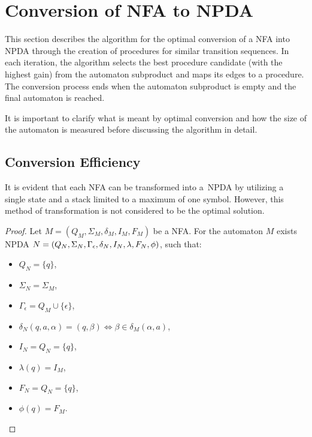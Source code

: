 \section{Conversion of NFA to NPDA}
    This section describes the algorithm for the optimal conversion of a NFA into NPDA through the creation of procedures for similar transition sequences. In each iteration, the algorithm selects the best procedure candidate (with the highest gain) from the automaton subproduct and maps its edges to a procedure. The conversion process ends when the automaton subproduct is empty and the final automaton is reached.

    It is important to clarify what is meant by optimal conversion and how the size of the automaton is measured before discussing the algorithm in detail.

    \subsection{Conversion Efficiency}
        \label{subsec:efficiency}
        It is evident that each NFA can be transformed into a~NPDA by utilizing a single state and a stack limited to a maximum of one symbol. However, this method of transformation is not considered to be the optimal solution.

        \begin{proof}
            Let $M = (Q_M, \Sigma_M, \delta_M, I_M, F_M)$ be a NFA. For the automaton $M$ exists NPDA $N = (Q_N, \Sigma_N, \Gamma_\epsilon, \delta_N, I_N,\\ \lambda, F_N, \phi)$, such that:
            \begin{itemize}
                \item $Q_N = \{q\}$,
                \item $\Sigma_N = \Sigma_M$,
                \item $\Gamma_\epsilon = Q_M \cup \{\epsilon\}$,
                \item $\delta_N(q, a, \alpha) = (q, \beta) \iff \beta \in \delta_M(\alpha, a)$,
                \item $I_N = Q_N = \{q\}$,
                \item $\lambda(q) = I_M$,
                \item $F_N = Q_N = \{q\}$,
                \item $\phi(q) = F_M$.
            \end{itemize}
            \vspace*{-1em}
        \end{proof}

